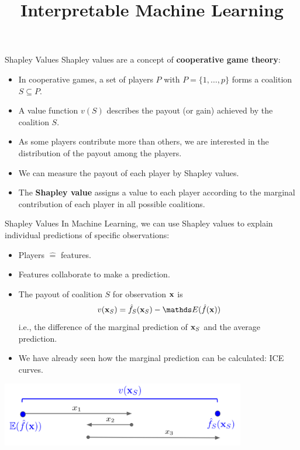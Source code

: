 \documentclass[10pt,compress,t,notes=noshow, xcolor=table]{beamer}
\title{Interpretable Machine Learning}
\date{}
\begin{document}


\begin{vbframe}{Shapley Values}
Shapley values are a concept of \textbf{cooperative game theory}:
\begin{itemize}
  \item In cooperative games, a set of players $P$ with $P = \{1, \hdots, p\}$ forms a coalition $S \subseteq P$.
  \item A value function $v(S)$ describes the payout (or gain) achieved by the coalition $S$.
  \item As some players contribute more than others, we are interested in the distribution of the payout among the players.
  \item We can measure the payout of each player by Shapley values.
  \item The \textbf{Shapley value} assigns a value to each player according to the marginal contribution of each player in all possible coalitions.
\end{itemize}
\end{vbframe}

\begin{vbframe}{Shapley Values}
In Machine Learning, we can use Shapley values to explain individual predictions of specific observations:
\begin{itemize}
  \item Players $\hat{=}$ features.
  \item Features collaborate to make a prediction.
  \item The payout of coalition $S$ for observation $\mathbf{x}$ is
  $$v(\xv_S) =  \fh_{S} (\xv_S) - \E (\fh(\xv))$$
  i.e., the difference of the marginal prediction of $\mathbf{x}_S$ and the average prediction.
  \item We have already seen how the marginal prediction can be calculated: ICE curves.
\end{itemize}
\begin{center}
\vspace{-0.3cm}
\includegraphics[width=0.8\textwidth]{figure_man/shapley_valuefct}
\end{center}
\end{vbframe}
\end{document}
